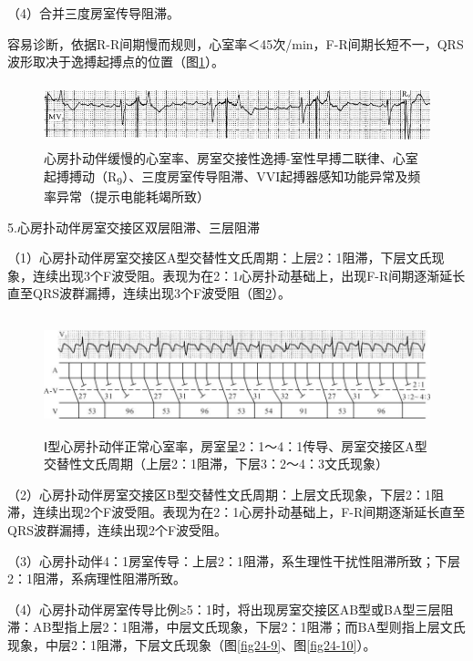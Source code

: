 （4）合并三度房室传导阻滞。

容易诊断，依据R-R间期慢而规则，心室率＜45次/min，F-R间期长短不一，QRS波形取决于逸搏起搏点的位置（图\ref{fig13-11}）。

\begin{figure}[!htbp]
 \centering
 \includegraphics[width=5.58333in,height=0.70833in]{./images/Image00219.jpg}
 \captionsetup{justification=centering}
 \caption{心房扑动伴缓慢的心室率、房室交接性逸搏-室性早搏二联律、心室起搏搏动（R\textsubscript{9}）、三度房室传导阻滞、VVI起搏器感知功能异常及频率异常（提示电能耗竭所致）}
 \label{fig13-11}
  \end{figure} 


5.心房扑动伴房室交接区双层阻滞、三层阻滞

（1）心房扑动伴房室交接区A型交替性文氏周期：上层2：1阻滞，下层文氏现象，连续出现3个F波受阻。表现为在2：1心房扑动基础上，出现F-R间期逐渐延长直至QRS波群漏搏，连续出现3个F波受阻（图\ref{fig13-12}）。

\begin{figure}[!htbp]
 \centering
 \includegraphics[width=5.875in,height=1.34375in]{./images/Image00220.jpg}
 \captionsetup{justification=centering}
 \caption{Ⅰ型心房扑动伴正常心室率，房室呈2：1～4：1传导、房室交接区A型交替性文氏周期（上层2：1阻滞，下层3：2～4：3文氏现象）}
 \label{fig13-12}
  \end{figure} 

（2）心房扑动伴房室交接区B型交替性文氏周期：上层文氏现象，下层2：1阻滞，连续出现2个F波受阻。表现为在2：1心房扑动基础上，F-R间期逐渐延长直至QRS波群漏搏，连续出现2个F波受阻。

（3）心房扑动伴4：1房室传导：上层2：1阻滞，系生理性干扰性阻滞所致；下层2：1阻滞，系病理性阻滞所致。

（4）心房扑动伴房室传导比例≥5：1时，将出现房室交接区AB型或BA型三层阻滞：AB型指上层2：1阻滞，中层文氏现象，下层2：1阻滞；而BA型则指上层文氏现象，中层2：1阻滞，下层文氏现象（图\ref{fig24-9}、图\ref{fig24-10}）。

